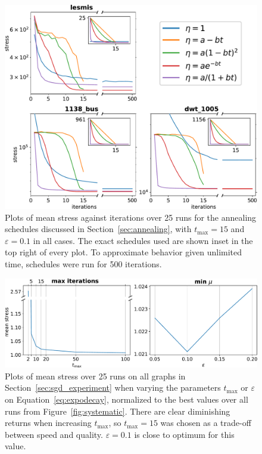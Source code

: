 \begin{figure}
  \centering
  \includegraphics[width=.85\textwidth]{stress/cooling.pdf}
  \caption[A comparison of different annealing schedules]{Plots of mean stress against iterations over 25 runs for the annealing schedules discussed in Section~\ref{sec:annealing}, with $t_{\max}=15$ and $\varepsilon=0.1$ in all cases. The exact schedules used are shown inset in the top right of every plot.
  To approximate behavior given unlimited time, schedules were run for 500 iterations.
  }
  \label{fig:annealing}
\end{figure}

\begin{figure}
  \centering
  \includegraphics[width=.95\textwidth]{stress/parameters.pdf}
  \caption[A comparison of annealing schedule parameterisations]{Plots of mean stress over 25 runs on all graphs in Section~\ref{sec:sgd_experiment} when varying the parameters $t_{\max}$ or $\varepsilon$ on Equation~\eqref{eq:expodecay}, normalized to the best values over all runs from Figure~\ref{fig:systematic}.
  There are clear diminishing returns when increasing $t_{\max}$, so $t_{\max}=15$ was chosen as a trade-off between speed and quality.
  $\varepsilon=0.1$ is close to optimum for this value.
  }
  \label{fig:parameters}
\end{figure}

